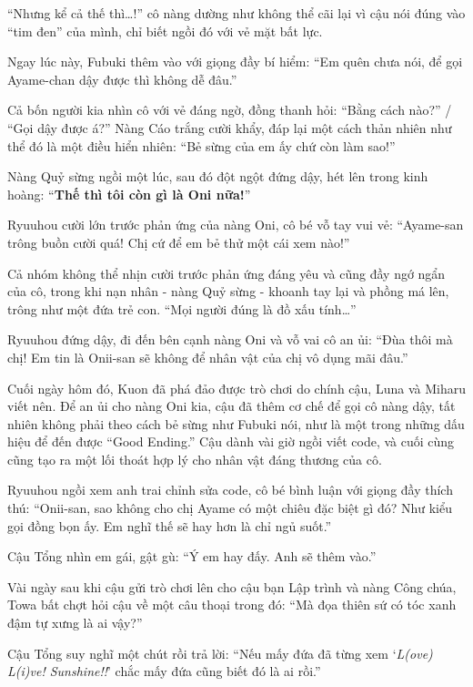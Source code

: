 \documentclass[../main.tex]{subfiles}
\begin{document}
``Nhưng kể cả thế thì\dots!'' cô nàng dường như không thể cãi lại vì cậu nói đúng vào ``tim đen'' của mình, chỉ biết ngồi đó với vẻ mặt bất lực.

Ngay lúc này, Fubuki thêm vào với giọng đầy bí hiểm: ``Em quên chưa nói, để gọi Ayame-chan dậy được thì không dễ đâu.''

Cả bốn người kia nhìn cô với vẻ đáng ngờ, đồng thanh hỏi: ``Bằng cách nào?'' / ``Gọi dậy được á?'' Nàng Cáo trắng cười khẩy, đáp lại một cách thản nhiên như thể đó là một điều hiển nhiên: ``Bẻ sừng của em ấy chứ còn làm sao!''

Nàng Quỷ sừng ngồi một lúc, sau đó đột ngột đứng dậy, hét lên trong kinh hoàng: ``\textbf{Thế thì tôi còn gì là Oni nữa!}''

Ryuuhou cười lớn trước phản ứng của nàng Oni, cô bé vỗ tay vui vẻ: ``Ayame-san trông buồn cười quá! Chị cứ để em bẻ thử một cái xem nào!''

Cả nhóm không thể nhịn cười trước phản ứng đáng yêu và cũng đầy ngớ ngẩn của cô, trong khi nạn nhân - nàng Quỷ sừng - khoanh tay lại và phồng má lên, trông như một đứa trẻ con. ``Mọi người đúng là đồ xấu tính\dots''

Ryuuhou đứng dậy, đi đến bên cạnh nàng Oni và vỗ vai cô an ủi: ``Đùa thôi mà chị! Em tin là Onii-san sẽ không để nhân vật của chị vô dụng mãi đâu.''

Cuối ngày hôm đó, Kuon đã phá đảo được trò chơi do chính cậu, Luna và Miharu viết nên. Để an ủi cho nàng Oni kia, cậu đã thêm cơ chế để gọi cô nàng dậy, tất nhiên không phải theo cách bẻ sừng như Fubuki nói, như là một trong những dấu hiệu để đến được ``Good Ending.'' Cậu dành vài giờ ngồi viết code, và cuối cùng cũng tạo ra một lối thoát hợp lý cho nhân vật đáng thương của cô.

Ryuuhou ngồi xem anh trai chỉnh sửa code, cô bé bình luận với giọng đầy thích thú: ``Onii-san, sao không cho chị Ayame có một chiêu đặc biệt gì đó? Như kiểu gọi đồng bọn ấy. Em nghĩ thế sẽ hay hơn là chỉ ngủ suốt.''

Cậu Tổng nhìn em gái, gật gù: ``Ý em hay đấy. Anh sẽ thêm vào.''

\il

Vài ngày sau khi cậu gửi trò chơi lên cho cậu bạn Lập trình và nàng Công chúa, Towa bất chợt hỏi cậu về một câu thoại trong đó: ``Mà đọa thiên sứ có tóc xanh đậm tự xưng là ai vậy?''

Cậu Tổng suy nghĩ một chút rồi trả lời: ``Nếu mấy đứa đã từng xem `\textit{L(ove) L(i)ve! Sunshine!!}' chắc mấy đứa cũng biết đó là ai rồi.''
\end{document}
